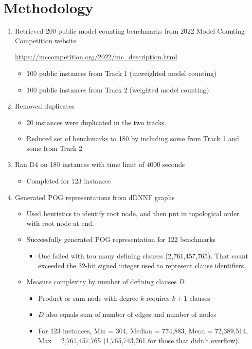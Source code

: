 \documentclass[twoside,11pt]{article}
\begin{document}
\section*{Methodology}
\begin{enumerate}
   \item Retrieved 200 public model counting benchmarks from 2022 Model Counting Competition website
     \begin{center}
       \url{https://mccompetition.org/2022/mc_description.html}
     \end{center}
     \begin{itemize}
     \item 100 public instances from Track 1 (unweighted model counting)
     \item 100 public instances from Track 2 (weighted model counting)
     \end{itemize}
   \item Removed duplicates
     \begin{itemize}
    \item  20 instances were duplicated in the two tracks.  
     \item Reduced set of benchmarks to 180 by including some from Track 1 and some from Track 2
     \end{itemize}
   \item Ran D4 on 180 instances with time limit of 4000 seconds
     \begin{itemize}
     \item Completed for 123 instances
     \end{itemize}
   \item Generated POG representations from dDNNF graphs
     \begin{itemize}
     \item Used heuristics to identify root node, and then put in topological order with root node at end.
     \item Successfully generated POG representation for 122 benchmarks
       \begin{itemize}
         \item One failed with too many defining clauses (2,761,457,765).  That count exceeded the 32-bit signed integer used to represent clause identifiers.
       \end{itemize}
       
     \item Measure complexity by number of defining clauses $D$
       \begin{itemize}
       \item Product or sum node with degree $k$ requires $k+1$ clauses
       \item $D$ also equals sum of number of edges and number of nodes
       \item For 123 instances, Min = 304, Median = 774,883, Mean = 72,389,514, Max = 2,761,457,765 (1,765,743,261 for those that didn't overflow).
       \end{itemize}


\end{itemize}
\end{enumerate}
\end{document}
